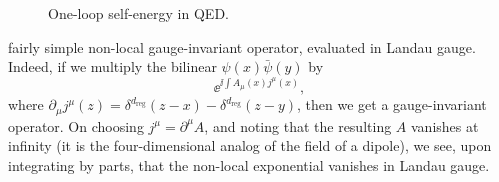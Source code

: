\begin{figure}[htbp]
  \centering
  
  \caption{One-loop self-energy in QED.}
  \label{fig:9.7}
\end{figure}

fairly simple non-local gauge-invariant operator, evaluated in Landau gauge.
Indeed, if we multiply the bilinear $\psi(x)\bar\psi(y)$ by
\[
  \ee^{\ii\int A_\mu(x)j^\mu(x)},
\]
where $\partial_\mu j^\mu(z)=\delta^{d_{\mathrm{reg}}}(z-x)-\delta^{d_{\mathrm{reg}}}(z-y)$, then we get a
gauge-invariant operator. On choosing $j^\mu=\partial^\mu A$, and noting that
the resulting $A$ vanishes at infinity (it is the four-dimensional analog of
the field of a dipole), we see, upon integrating by parts, that the non-local
exponential vanishes in Landau gauge.

